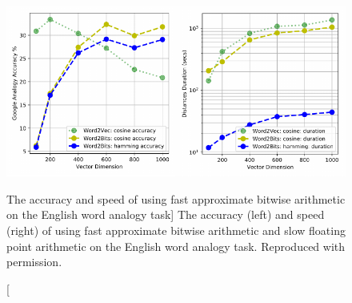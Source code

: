 \begin{figure}
\includegraphics{word2bits-speed}
\vspace{-0.8cm}
\caption
  [The accuracy and speed of using fast approximate bitwise arithmetic
   on the English word analogy task]%
  {The accuracy (left) and speed (right) of using fast approximate
   bitwise arithmetic and slow floating point arithmetic on the English word
   analogy task. Reproduced with permission. \cite[Figure 3.8]{stefanik2019semantic}}
\protect{}
\label{fig:quantized-token-embeddings-with-fast-bitwise-arithmetic}
\end{figure}
